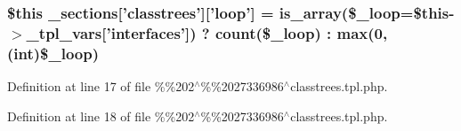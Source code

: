 {{{{\subsubsection[{\-\_\-sections}]{\setlength{\rightskip}{0pt plus 5cm}\$this {\bf \-\_\-sections}\mbox{[}'classtrees'\mbox{]}\mbox{[}'loop'\mbox{]} = is\-\_\-array(\$\-\_\-loop=\$this-\/$>${\bf \-\_\-tpl\-\_\-vars}\mbox{[}'interfaces'\mbox{]}) ? count(\$\-\_\-loop) \-: max(0, (int)\$\-\_\-loop)}}\label{_06_06202_05_06_062027336986_05classtrees_8tpl_8php_a39056ca32644dc1009e6680be58154c4}


\-Definition at line 17 of file \%\%202$^\wedge$\%\%2027336986$^\wedge$classtrees.\-tpl.\-php.

\hypertarget{_06_06202_05_06_062027336986_05classtrees_8tpl_8php_a9ed73dd0b9365af2ae5c06eaf751f4bb}{
\index{\-\_\-sections@{\-\_\-sections}!%
\subsubsection[{\-\_\-sections}]{\setlength{\rightskip}{0pt plus 5cm}\$this {\bf \-\_\-sections}\mbox{[}'classtrees'\mbox{]}\mbox{[}'show'\mbox{]} = true}}\label{_06_06202_05_06_062027336986_05classtrees_8tpl_8php_a9ed73dd0b9365af2ae5c06eaf751f4bb}


\-Definition at line 18 of file \%\%202$^\wedge$\%\%2027336986$^\wedge$classtrees.\-tpl.\-php.

\hypertarget{_06_06202_05_06_062027336986_05classtrees_8tpl_8php_a6ea7e35a31bfb2f87855dfcd439bcb51}{
\index{\-\_\-sections@{\-\_\-sections}!%
\subsubsection[{\-\_\-sections}]{\setlength{\rightskip}{0pt plus 5cm}\$this {\bf \-\_\-sections}\mbox{[}'classtrees'\mbox{]}\mbox{[}'max'\mbox{]} = \$this-\/$>${\bf \-\_\-sections}\mbox{[}'classtrees'\mbox{]}\mbox{[}'loop'\mbox{]}}}\label{_06_06202_05_06_062027336986_05classtrees_8tpl_8php_a6ea7e35a31bfb2f87855dfcd439bcb51}


}}}}}
